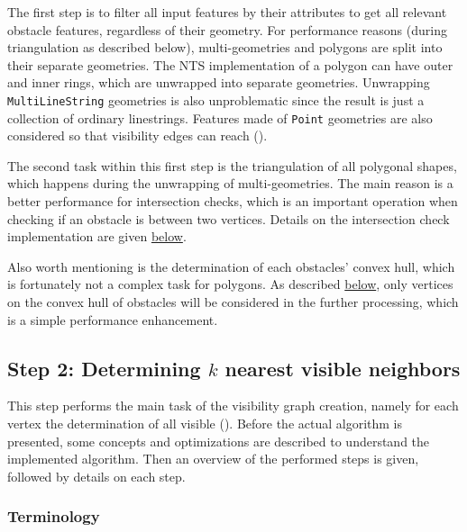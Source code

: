 		The first step is to filter all input features by their attributes to get all relevant obstacle features, regardless of their geometry.
		For performance reasons (during triangulation as described below), multi-geometries and polygons are split into their separate geometries.
		The NTS implementation of a polygon can have outer and inner rings, which are unwrapped into separate geometries.
		Unwrapping \texttt{MultiLineString} geometries is also unproblematic since the result is just a collection of ordinary linestrings.
		Features made of \texttt{Point} geometries are also considered so that visibility edges can reach  ().
		
		The second task within this first step is the triangulation of all polygonal shapes, which happens during the unwrapping of multi-geometries.
		The main reason is a better performance for intersection checks, which is an important operation when checking if an obstacle is between two vertices.
		Details on the intersection check implementation are given \hyperref[subsubsec:intersection-checks]{below}.
		
		Also worth mentioning is the determination of each obstacles' convex hull, which is fortunately not a complex task for polygons.
		As described \hyperref[subsubsec:convex-hull]{below}, only vertices on the convex hull of obstacles will be considered in the further processing, which is a simple performance enhancement.
			
	\subsection{Step 2: Determining $k$ nearest visible neighbors}
	\label{subsec:step-2-knn-search}
			
		This step performs the main task of the visibility graph creation, namely for each vertex the determination of all visible  ().
		Before the actual algorithm is presented, some concepts and optimizations are described to understand the implemented algorithm.
		Then an overview of the performed steps is given, followed by details on each step.
		
		\subsubsection{Terminology}
		
